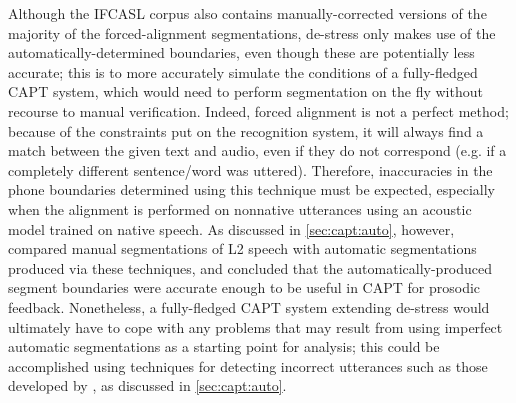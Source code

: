 	
	
	Although the IFCASL corpus also contains manually-corrected versions of the majority of the forced-alignment segmentations,
	de-stress only makes use of the automatically-determined boundaries, even though these are potentially less accurate; 
	this is to more accurately 
	simulate the conditions of a 
	fully-fledged CAPT system,
	which 
	would need to perform segmentation on the fly without recourse to manual verification.
	Indeed, 
	forced alignment is not a perfect method; because of the constraints put on the recognition system, it will always find a match between the given text and audio, even if they do not correspond (e.g. if a completely different sentence/word was uttered).  
	Therefore, inaccuracies in the phone boundaries determined using this technique must be expected, especially when the alignment is performed on nonnative utterances using an acoustic model trained on native speech.
	As discussed in \cref{sec:capt:auto}, however, \textcite{Mesbahi2011} compared manual segmentations of L2 speech with automatic segmentations produced via these techniques, and concluded that the automatically-produced segment boundaries were accurate enough to be useful in CAPT for prosodic feedback.
		Nonetheless, a fully-fledged CAPT system extending de-stress would ultimately have to cope with any problems that may result from using imperfect automatic segmentations as a starting point for analysis; this could be accomplished using techniques for detecting incorrect utterances such as those developed by \textcite{Bonneau2012,Orosanu2012}, as discussed in \cref{sec:capt:auto}.
	
